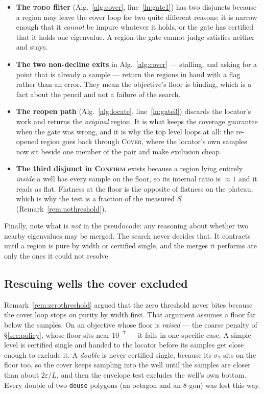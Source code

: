 \documentclass[11pt]{article}
\newcommand{\proc}[1]{\textnormal{\scshape #1}}
\theoremstyle{definition}
\theoremstyle{remark}
\newcommand{\code}[1]{\texttt{#1}}
\newcommand{\sig}{\sigma}
\begin{document}
\begin{itemize}
\item \textbf{The \proc{todo} filter} (Alg.~\ref{alg:cover}, line~\ref{ln:gate1}) has two
disjuncts because a region may leave the cover loop for two quite different reasons: it is
narrow enough that it \emph{cannot} be impure whatever it holds, or the gate has certified that
it holds one eigenvalue. A region the gate cannot judge satisfies neither and stays.

\item \textbf{The two non-decline exits} in Alg.~\ref{alg:cover} --- stalling, and asking for a
point that is already a sample --- return the regions in hand with a flag rather than an error.
They mean the objective's floor is binding, which is a fact about the pencil and not a failure
of the search.

\item \textbf{The reopen path} (Alg.~\ref{alg:locate}, line~\ref{ln:gate3}) discards the
locator's work and returns the \emph{original} region. It is what keeps the coverage guarantee
when the gate was wrong, and it is why the top level loops at all: the re-opened region goes
back through \proc{Cover}, where the locator's own samples now sit beside one member of the
pair and make exclusion cheap.

\item \textbf{The third disjunct in \proc{Confirm}} exists because a region lying entirely
\emph{inside} a well has every sample on the floor, so its internal ratio is $\approx1$ and it
reads as flat. Flatness at the floor is the opposite of flatness on the plateau, which is why
the test is a fraction of the measured $S$ (Remark~\ref{rem:nothreshold}).
\end{itemize}

Finally, note what is \emph{not} in the pseudocode: any reasoning about whether two nearby
eigenvalues may be merged. The search never decides that. It contracts until a region is pure
by width or certified single, and the merges it performs are only the ones it could not
resolve.

\subsection{Rescuing wells the cover excluded}
\label{sec:rescue}

Remark~\ref{rem:zerothreshold} argued that the zero threshold never bites because the cover
loop stops on purity by width first. That argument assumes a floor far below the samples. On
an objective whose floor is \emph{raised} --- the coarse penalty of \S\ref{sec:policy}, whose
floor sits near $10^{-7}$ --- it fails in one specific case. A simple level is certified single
and handed to the locator before its samples get close enough to exclude it. A \emph{double}
is never certified single, because its $\sig_2$ sits on the floor too, so the cover keeps
sampling into the well until the samples are closer than about $2\varepsilon/L$, and then the
envelope test excludes the well's own bottom. Every double of two \code{douse} polygons (an
octagon and an 8-gon) was lost this way.
\end{document}
